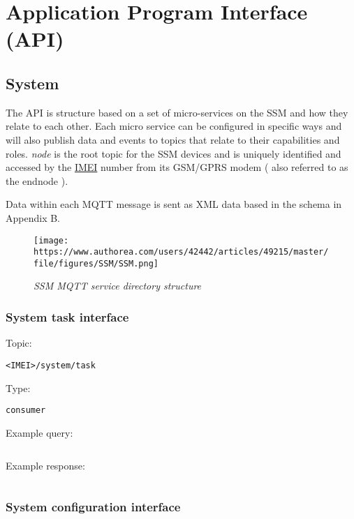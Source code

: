 \section{Application Program Interface (API)}
\subsection{System}
The API is structure based on a set of micro-services on the SSM and how they relate to each other. Each micro service can be configured in specific ways and will also publish data and events to topics that relate to their capabilities and roles. \textit{node} is the root topic for the SSM devices and is uniquely identified and accessed by the \href{http://www.gsma.com/technicalprojects/faq/what-is-an-imei}{IMEI} number from its GSM/GPRS modem ( also referred to as the endnode ).

Data within each MQTT message is sent as XML data based in the schema in Appendix B.

\begin{figure}[h]
    \centering
    \texttt{[image: https://www.authorea.com/users/42442/articles/49215/master/file/figures/SSM/SSM.png]}
    \caption{\textit{SSM MQTT service directory structure}}
\end{figure}
\subsubsection{System task interface}

Topic:
\begin{lstlisting}<IMEI>/system/task\end{lstlisting}
Type:
\begin{lstlisting}consumer\end{lstlisting}
Example query:
\begin{lstlisting}\end{lstlisting}
Example response:
\begin{lstlisting}\end{lstlisting}

\subsubsection{System configuration interface}

